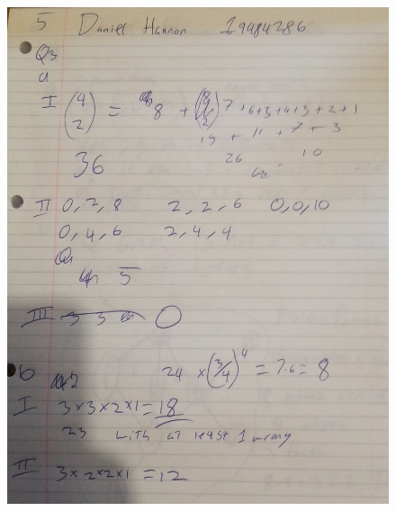 \documentclass{article}
\begin{document}
	\begin{figure}
		\centering
		\includegraphics[width=\textwidth]{IMG_20210118_111941.jpg}
	\end{figure}
	\newpage
\end{document}
